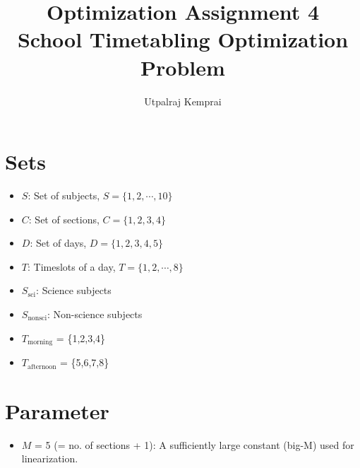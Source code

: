 \documentclass[11pt]{article}
\begin{document}
\title{Optimization Assignment 4 \\School Timetabling Optimization Problem}
\author{Utpalraj Kemprai}
\date{}
\maketitle

\section*{Sets}
\begin{itemize}
    \item $S$: Set of subjects, $S = \{1,2,\cdots, 10\}$
    \item $C$: Set of sections, $C = \{1,2,3,4\}$
    \item $D$: Set of days, $D = \{1,2,3,4,5\}$
    \item $T$: Timeslots of a day, $T = \{1,2,\cdots,8\}$
    \item $S_{\text{sci}}$: Science subjects
    \item $S_{\text{nonsci}}$: Non-science subjects
    \item $T_{\text{morning}}$ = \{1,2,3,4\}
    \item $T_{\text{afternoon}}$ = \{5,6,7,8\}
\end{itemize}

\section*{Parameter}
\begin{itemize}
    \item \(M\) = 5 (= no. of sections + 1): A sufficiently large constant (big-M) used for linearization. 
\end{itemize}
\end{document}
